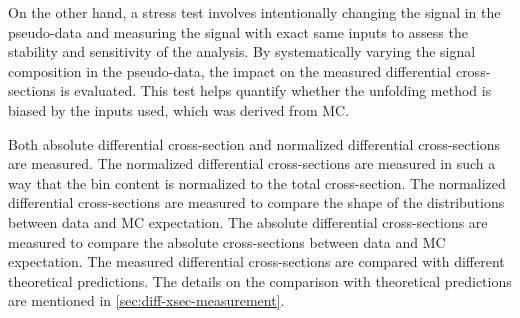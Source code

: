 On the other hand, a stress test involves intentionally changing the signal in the pseudo-data and measuring the signal with exact same inputs to assess the stability and sensitivity of the analysis. By systematically varying the signal composition in the pseudo-data, the impact on the measured differential cross-sections is evaluated. This test helps quantify whether the unfolding method is biased by the inputs used, which was derived from MC.

Both absolute differential cross-section and normalized differential cross-sections are measured. The normalized differential cross-sections are measured in such a way that the bin content is normalized to the total cross-section. The normalized differential cross-sections are measured to compare the shape of the distributions between data and MC expectation. The absolute differential cross-sections are measured to compare the absolute cross-sections between data and MC expectation. The measured differential cross-sections are compared with different theoretical predictions. The details on the comparison with theoretical predictions are mentioned in \cref{sec:diff-xsec-measurement}.